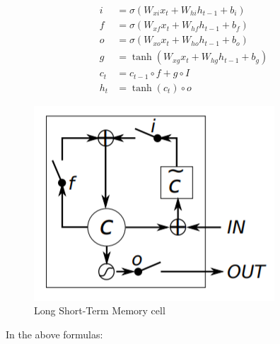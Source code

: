 \begin{align}
i &= \sigma ( W_{xi}x_{t} + W _{hi}h _{t-1} + b _{i}) \\
f &= \sigma(W_{xf}x_{t} + W_{hf}h_{t-1} + b_{f}) \\
o &= \sigma(W_{xo}x_{t} + W_{ho}h_{t-1} + b_{o})	\\
g &= \tanh (W_{xg}x_{t} + W_{hg}h_{t-1} + b_{g})	\\
c_{t} &= c_{t-1} \circ f+ g \circ I	\\
h_{t} &= \tanh(c_{t}) \circ o
\end{align}
\begin{center}
  \begin{figure}[H]
  \centering
  \includegraphics[width=0.5\columnwidth]{images/chap2/LSTM.png}
  \caption{Long Short-Term Memory cell \cite{DBLP:journals/corr/DonahueHGRVSD14}}
  \label{chap2:WSP}
  \end{figure}
\end{center}
\vspace{-1cm}
In the above formulas:

